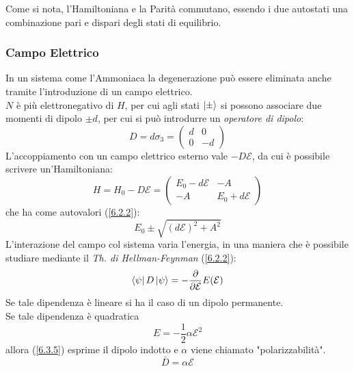 \documentclass[twoside]{article}
\begin{document}
Come si nota, l'Hamiltoniana e la Parità commutano, essendo i due autostati una combinazione pari e dispari degli stati di equilibrio.


\subsubsection{Campo Elettrico}
In un sistema come l'Ammoniaca la degenerazione può essere eliminata anche tramite l'introduzione di un campo elettrico.
\\
$N$ è più elettronegativo di $H$, per cui agli stati $\ket{\pm}$ si possono associare due momenti di dipolo $\pm d$, per cui si può introdurre un \textit{operatore di dipolo}:
\begin{equation}
    D=d\sigma_3=\begin{pmatrix}
    d & 0 \\
    0 & -d
    \end{pmatrix}
\end{equation}
L'accoppiamento con un campo elettrico esterno vale $-D\mathcal{E}$, da cui è possibile scrivere un'Hamiltoniana:
\begin{equation}
    H=H_0-D\mathcal{E}=
    \begin{pmatrix}
    E_0 -d\mathcal{E} & -A \\
    -A & E_0 + d\mathcal{E}
    \end{pmatrix}
\end{equation}
che ha come autovalori (\ref{6.2.2}):
\begin{equation}
    E_0 \pm \sqrt{(d\mathcal{E})^2 + A^2}
\end{equation}
L'interazione del campo col sistema varia l'energia, in una maniera che è possibile studiare mediante il \textit{Th. di Hellman-Feynman} (\ref{6.2.2}):
\begin{equation} \label{6.3.5}
    \bra{\psi}D\ket{\psi}=-\frac{\partial}{\partial \mathcal{E}}E(\mathcal{E})
\end{equation}
Se tale dipendenza è lineare si ha il caso di un dipolo permanente.
\\
Se tale dipendenza è quadratica 
\begin{equation}
E=-\frac{1}{2} \alpha \mathcal{E}^2
\end{equation}
allora (\ref{6.3.5}) esprime  il dipolo indotto e $\alpha$ viene chiamato "polarizzabilità".
\begin{equation}
    \bar{D}=\alpha \mathcal{E}
\end{equation}
\end{document}
